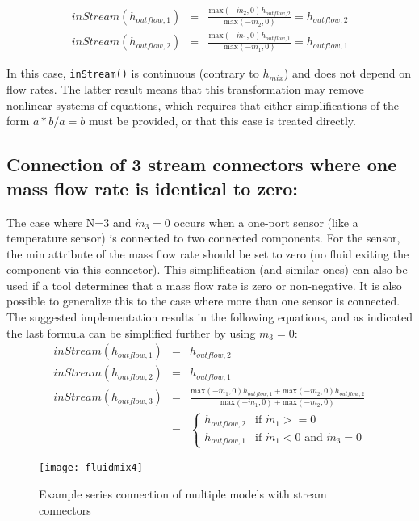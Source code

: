 \begin{eqnarray*}
inStream(h_{outflow,1})&=&\frac{\text{max}(-\dot{m}_2,0)h_{outflow,2}}{\text{max}(-\dot{m}_2,0)}=h_{outflow,2}\\
inStream(h_{outflow,2})&=&\frac{\text{max}(-\dot{m}_1,0)h_{outflow,1}}{\text{max}(-\dot{m}_1,0)}=h_{outflow,1}
\end{eqnarray*}

In this case, \lstinline!inStream()! is continuous (contrary to $h_{mix}$) and does not
depend on flow rates. The latter result means that this transformation
may remove nonlinear systems of equations, which requires that either
simplifications of the form $a * b / a = b$ must be provided, or that this
case is treated directly.

\subsection{Connection of 3 stream connectors where one mass flow rate is identical to zero:}
The case where N=3 and $\dot{m}_3=0$ occurs when a one-port sensor (like a temperature sensor) is
connected to two connected components. For the sensor, the min attribute
of the mass flow rate should be set to zero (no fluid exiting the
component via this connector).
This simplification (and similar ones) can also be used if a tool determines that a mass flow rate is zero or non-negative.
It is also possible to generalize this to the case where more than one sensor is connected.
The suggested implementation results in
the following equations, and as indicated the last formula can be
simplified further by using $\dot{m}_3=0$:
\begin{eqnarray*}
inStream(h_{outflow,1})&=&h_{outflow,2}\\
inStream(h_{outflow,2})&=&h_{outflow,1}\\
inStream(h_{outflow,3})&=&\frac{\text{max}(-\dot{m}_1,0)h_{outflow,1}+\text{max}(-\dot{m}_2,0)h_{outflow,2}}{\text{max}(-\dot{m}_1,0)+\text{max}(-\dot{m}_2,0)}\\
&=&\begin{cases}
h_{outflow,2}&\text{if $\dot{m}_1>=0$}\\
h_{outflow,1}&\text{if $\dot{m}_1<0$ and $\dot{m}_3=0$}
\end{cases}
\end{eqnarray*}
\begin{figure}[H]
\caption{Example series connection of multiple models with stream connectors }
\begin{center}
\texttt{[image: fluidmix4]}
\end{center}
\end{figure}

